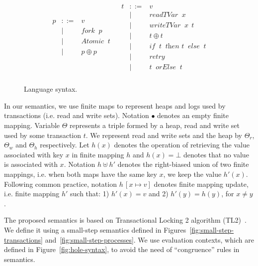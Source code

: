 \documentclass{jfp1}
\newcommand{\Fork}{\textit{fork }}
\newcommand{\Atomic}{\textit{Atomic }}
\newcommand{\Read}{\textit{readTVar }}
\newcommand{\Write}{\textit{writeTVar }}
\newcommand{\If}{\textit{if }}
\newcommand{\Then}{\textit{ then }}
\newcommand{\Else}{\textit{ else }}
\newcommand{\Retry}{\textit{retry}}
\newcommand{\OrElse}{\textit{ orElse }}
\begin{document}
\begin{figure}[h]
  \[
        \begin{array}{ll}
             \begin{array}{lcl}
             p & ::=    & v   \\                                        
                & \mid & \Fork\:p   \\
                & \mid & \Atomic\:t   \\                         
                & \mid & p \oplus p       \\                     
             \end{array} 
             &
             \begin{array}{lcl}
             t  & ::=    & v  \\
                & \mid & \Read\:x \\
                & \mid & \Write\:x\:\:t \\
                & \mid & t \oplus t \\
                & \mid & \If\: t\: \Then t \: \Else\: t \\
                & \mid & \Retry \\
                & \mid & t\: \OrElse\: t \\
             \end{array}                
        \end{array}
  \]
  \centering
  \caption{Language syntax.}
  \label{fig:syntax}
\end{figure}

In our semantics, we use finite maps to 
represent heaps and logs used by transactions (i.e. read and write
sets). Notation $\bullet$ denotes an empty finite mapping.
Variable $\Theta$ represents a triple formed by a heap, read and
write set used by some transaction $t$. We represent read and write
sets and the heap by $\Theta_r$, $\Theta_w$ and $\Theta_h$
respectively. Let $h(x)$ denotes the operation
of retrieving the value associated with key $x$ in finite mapping 
$h$ and $h(x)=\bot$ denotes that no value is associated
with $x$.
Notation $h \uplus h'$ denotes the right-biased union of 
two finite mappings, i.e. when both maps have the same key $x$, we keep
the value $h'(x)$. Following common
practice, notation $h\,[x\mapsto v]$ denotes
finite mapping update, i.e. finite mapping $h'$ such that:
1) $h'(x) = v$ and 2) $h'(y) = h(y)$, for $x \neq y$.

The proposed semantics is based on Transactional Locking 2 
algorithm (TL2)~\cite{Dice06}. We define it using a small-step 
semantics defined in Figures~\ref{fig:small-step-transactions} 
and~\ref{fig:small-step-processes}. We use evaluation contexts, which
are defined in Figure~\ref{fig:hole-syntax}, to avoid the need of 
``congruence'' rules in semantics.
\end{document}
